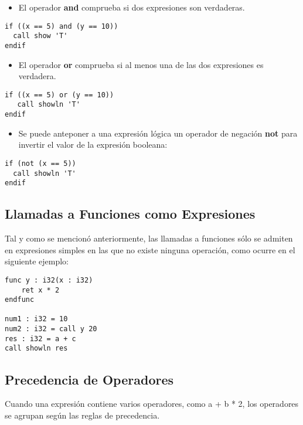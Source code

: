 \begin{itemize}
    \item El operador \textbf{and} comprueba si dos expresiones son verdaderas.
\end{itemize}

\begin{verbatim}
if ((x == 5) and (y == 10))
  call show 'T'
endif
\end{verbatim}

\begin{itemize}
    \item El operador \textbf{or} comprueba si al menos una de las dos expresiones es verdadera.
\end{itemize}

\begin{verbatim}
if ((x == 5) or (y == 10))
   call showln 'T'
endif
\end{verbatim}

\begin{itemize}
    \item Se puede anteponer a una expresión lógica un operador de negación \textbf{not}
    para invertir el valor de la expresión booleana:
\end{itemize}

\begin{verbatim}
if (not (x == 5))
  call showln 'T'
endif
\end{verbatim}

\subsection{Llamadas a Funciones como Expresiones}

Tal y como se mencionó anteriormente, las llamadas a funciones
sólo se admiten en expresiones simples en las que no existe
ninguna operación, como ocurre en el siguiente ejemplo:

\begin{verbatim}
func y : i32(x : i32)
    ret x * 2
endfunc

num1 : i32 = 10
num2 : i32 = call y 20
res : i32 = a + c
call showln res
\end{verbatim}

\subsection{Precedencia de Operadores}

Cuando una expresión contiene varios operadores, como a + b * 2, los operadores se agrupan según las reglas de precedencia.


